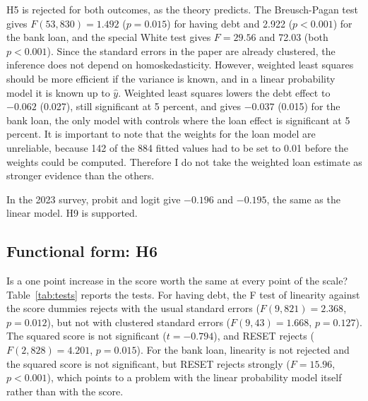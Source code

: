 \documentclass[preprint,letterpaper,11pt,authoryear]{elsarticle}
\begin{document}
H5 is rejected for both outcomes, as the theory predicts. The Breusch-Pagan test gives $F(53, 830) = 1.492$ ($p = 0.015$) for having debt and 2.922 ($p < 0.001$) for the bank loan, and the special White test gives $F = 29.56$ and 72.03 (both $p < 0.001$). Since the standard errors in the paper are already clustered, the inference does not depend on homoskedasticity. However, weighted least squares should be more efficient if the variance is known, and in a linear probability model it is known up to $\hat{y}$. Weighted least squares lowers the debt effect to $-0.062$ (0.027), still significant at 5 percent, and gives $-0.037$ (0.015) for the bank loan, the only model with controls where the loan effect is significant at 5 percent. It is important to note that the weights for the loan model are unreliable, because 142 of the 884 fitted values had to be set to 0.01 before the weights could be computed. Therefore I do not take the weighted loan estimate as stronger evidence than the others.

In the 2023 survey, probit and logit give $-0.196$ and $-0.195$, the same as the linear model. H9 is supported.

\subsection{Functional form: H6}

Is a one point increase in the score worth the same at every point of the scale? Table~\ref{tab:tests} reports the tests. For having debt, the F test of linearity against the score dummies rejects with the usual standard errors ($F(9, 821) = 2.368$, $p = 0.012$), but not with clustered standard errors ($F(9, 43) = 1.668$, $p = 0.127$). The squared score is not significant ($t = -0.794$), and RESET rejects ($F(2, 828) = 4.201$, $p = 0.015$). For the bank loan, linearity is not rejected and the squared score is not significant, but RESET rejects strongly ($F = 15.96$, $p < 0.001$), which points to a problem with the linear probability model itself rather than with the score.
\end{document}
